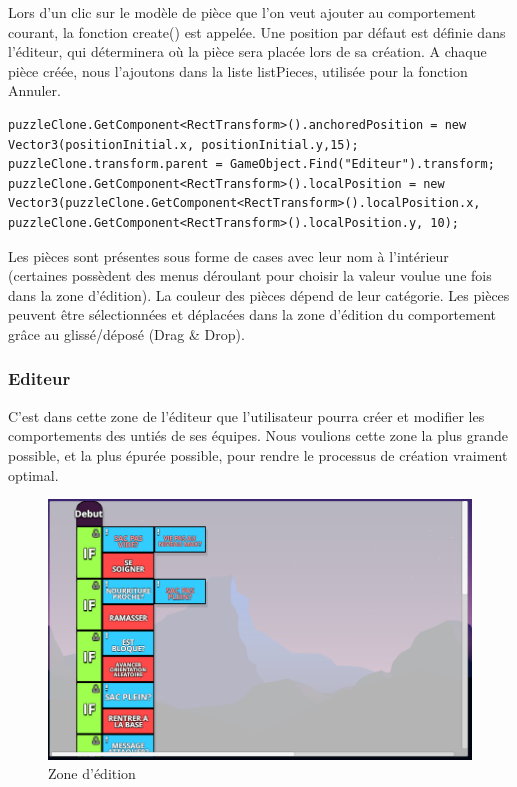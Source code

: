 \documentclass{report}
\begin{document}
\begin{enumerate}[label=\Alph*)]
\begin{itemize}
Lors d'un clic sur le modèle de pièce que l'on veut ajouter au comportement courant, la fonction create() est appelée. Une position par défaut est définie dans l'éditeur, qui déterminera où la pièce sera placée lors de sa création.\newline
A chaque pièce créée, nous l'ajoutons dans la liste listPieces, utilisée pour la fonction Annuler.

\begin{lstlisting}[frame=single]
puzzleClone.GetComponent<RectTransform>().anchoredPosition = new Vector3(positionInitial.x, positionInitial.y,15);
puzzleClone.transform.parent = GameObject.Find("Editeur").transform;
puzzleClone.GetComponent<RectTransform>().localPosition = new Vector3(puzzleClone.GetComponent<RectTransform>().localPosition.x, puzzleClone.GetComponent<RectTransform>().localPosition.y, 10);
\end{lstlisting}

Les pièces sont présentes sous forme de cases avec leur nom à l'intérieur (certaines possèdent des menus déroulant pour choisir la valeur voulue une fois dans la zone d'édition). La couleur des pièces dépend de leur catégorie.
Les pièces peuvent être sélectionnées et déplacées dans la zone d'édition du comportement grâce au glissé/déposé (Drag \& Drop).
\end{itemize}
\end{enumerate}

\subsubsection{Editeur}
C'est dans cette zone de l'éditeur que l’utilisateur pourra créer et modifier les comportements des untiés de ses équipes.
Nous voulions cette zone la plus grande possible, et la plus épurée possible, pour rendre le processus de création vraiment optimal.
\clearpage
\begin{figure}[h]
	\centering
		\includegraphics[scale=0.7]{ZoneEdition}
	\caption{Zone d'édition}
\end{figure}
\end{document}
